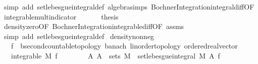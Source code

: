 \begin{isabellebody}
\ {\isacharparenleft}{\kern0pt}simp\ add{\isacharcolon}{\kern0pt}\ set{\isacharunderscore}{\kern0pt}lebesgue{\isacharunderscore}{\kern0pt}integral{\isacharunderscore}{\kern0pt}def\ algebra{\isacharunderscore}{\kern0pt}simps\ Bochner{\isacharunderscore}{\kern0pt}Integration{\isachardot}{\kern0pt}integral{\isacharunderscore}{\kern0pt}diff{\isacharbrackleft}{\kern0pt}OF\ integrable{\isacharunderscore}{\kern0pt}mult{\isacharunderscore}{\kern0pt}indicator{\isacharparenleft}{\kern0pt}{}{\isacharcomma}{\kern0pt}{}{\isacharparenright}{\kern0pt}{\isacharbrackright}{\kern0pt}{\isacharparenright}{\kern0pt}\isanewline
\ \ \isacommand{{\isacharbraceright}{\kern0pt}}\isamarkupfalse%
\isanewline
\ \ \isamarkupfalse%
\ {\isacharquery}{\kern0pt}thesis\ \isamarkupfalse%
\ density{\isacharunderscore}{\kern0pt}zero{\isacharbrackleft}{\kern0pt}OF\ Bochner{\isacharunderscore}{\kern0pt}Integration{\isachardot}{\kern0pt}integrable{\isacharunderscore}{\kern0pt}diff{\isacharbrackleft}{\kern0pt}OF\ assms{\isacharparenleft}{\kern0pt}{}{\isacharcomma}{\kern0pt}{}{\isacharparenright}{\kern0pt}{\isacharbrackright}{\kern0pt}{\isacharbrackright}{\kern0pt}\ \isamarkupfalse%
\ {\isacharparenleft}{\kern0pt}simp\ add{\isacharcolon}{\kern0pt}\ set{\isacharunderscore}{\kern0pt}lebesgue{\isacharunderscore}{\kern0pt}integral{\isacharunderscore}{\kern0pt}def{\isacharparenright}{\kern0pt}\isanewline
{}\isamarkupfalse%
%
\endisatagproof
{\isafoldproof}%
%
\isadelimproof
\isanewline
%
\endisadelimproof
\isanewline
{}\isamarkupfalse%
\ density{\isacharunderscore}{\kern0pt}nonneg{\isacharcolon}{\kern0pt}\isanewline
\ \ \ f{\isacharcolon}{\kern0pt}{\isacharcolon}{\kern0pt}{\isachardoublequoteopen}{\isacharunderscore}{\kern0pt}\ {\isasymRightarrow}\ {\isacharprime}{\kern0pt}b{\isacharcolon}{\kern0pt}{\isacharcolon}{\kern0pt}{\isacharbraceleft}{\kern0pt}second{\isacharunderscore}{\kern0pt}countable{\isacharunderscore}{\kern0pt}topology{\isacharcomma}{\kern0pt}\ banach{\isacharcomma}{\kern0pt}\ linorder{\isacharunderscore}{\kern0pt}topology{\isacharcomma}{\kern0pt}\ ordered{\isacharunderscore}{\kern0pt}real{\isacharunderscore}{\kern0pt}vector{\isacharbraceright}{\kern0pt}{\isachardoublequoteclose}\isanewline
\ \ \ {\isachardoublequoteopen}integrable\ M\ f{\isachardoublequoteclose}\ \isanewline
\ \ \ \ \ \ \ {\isachardoublequoteopen}{\isasymAnd}A{\isachardot}{\kern0pt}\ A\ {\isasymin}\ sets\ M\ {\isasymLongrightarrow}\ set{\isacharunderscore}{\kern0pt}lebesgue{\isacharunderscore}{\kern0pt}integral\ M\ A\ f\ {\isasymge}\ {}{\isachardoublequoteclose}\isanewline

\end{isabellebody}
